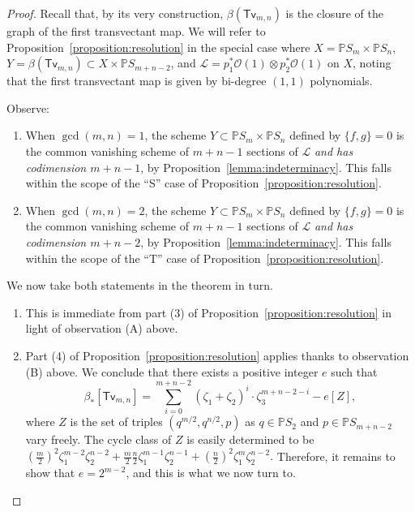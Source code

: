 \documentclass[12pt]{article}
\theoremstyle{plain}
\theoremstyle{remark}
\renewcommand{\P}{\mathbb{P}}
\renewcommand{\O}{\mathscr{O}}
\renewcommand{\L}{\mathscr{L}}
\newcommand{\transvectant}{\mathsf{Tv}}
\begin{document}
    \begin{proof}
        \label{proof:czvclass}
        Recall that, by its very construction, $\beta(\transvectant_{m,n})$ is the closure of the graph of the first transvectant map.  We will refer to Proposition~\ref{proposition:resolution} in the special case where $X = \P S_{m} \times \P S_{n}$, $Y = \beta(\transvectant_{m,n}) \subset X \times \P S_{m+n-2}$, and $\L = p_1^{*}\O(1) \otimes p_2^{*}\O(1)$ on $X$, noting that the first transvectant map is given by bi-degree $(1,1)$ polynomials.

Observe:
\begin{enumerate}
    \item[(A)] When $\gcd(m,n) = 1$, the scheme $Y \subset \P S_{m} \times \P S_{n}$ defined by $\{f,g\} = 0$ is the common vanishing scheme of $m+n-1$ sections of $\L$ {\sl and has codimension $m+n-1$}, by Proposition~\ref{lemma:indeterminacy}. This falls within the scope of the ``S'' case of Proposition~\ref{proposition:resolution}.
    \item[(B)] When $\gcd(m,n) = 2$, the scheme $Y \subset \P S_{m} \times \P S_{n}$ defined by $\{f,g\} = 0$ is the common vanishing scheme of $m+n-1$ sections of $\L$ {\sl and has codimension $m+n-2$}, by Proposition~\ref{lemma:indeterminacy}. This falls within the scope of the ``T'' case of Proposition~\ref{proposition:resolution}.
\end{enumerate}

We now take both statements in the theorem in turn.

    \begin{enumerate}
        \item This is immediate from part (3) of Proposition~\ref{proposition:resolution} in light of observation (A) above.
        \item Part (4) of Proposition~\ref{proposition:resolution} applies thanks to observation (B) above.  We conclude that there exists a positive integer $e$ such that
        \[
            \beta_{*}[\transvectant_{m,n}] = \sum_{i=0}^{m+n-2} (\zeta_{1}+\zeta_{2})^{i} \cdot \zeta_{3}^{m+n-2-i} - e[Z],
        \]
        where $Z$ is the set of triples $(q^{m/2},q^{n/2},p)$ as $q \in \P S_{2}$ and $p \in \P S_{m+n-2}$ vary freely.  The cycle class of $Z$ is easily determined to be $\left(\frac{m}{2}\right)^{2}\zeta_{1}^{m-2}\zeta_{2}^{n-2} + \frac{m}{2}\frac{n}{2}\zeta_{1}^{m-1}\zeta_{2}^{n-1} + \left(\frac{n}{2}\right)^{2}\zeta_{1}^{m}\zeta_{2}^{n-2}.$  Therefore, it remains to show that $e = 2^{m-2}$, and this is what we now turn to.


\end{enumerate}
\end{proof}
\end{document}

